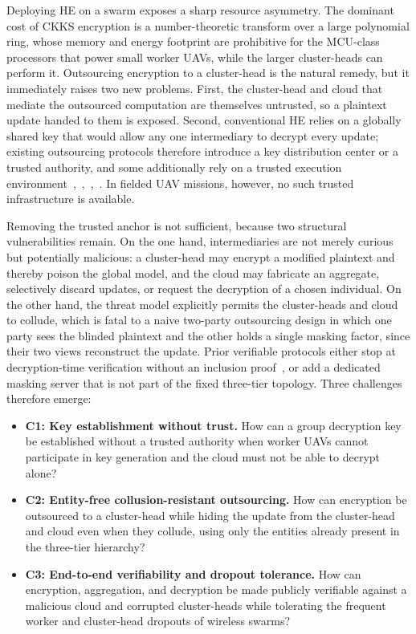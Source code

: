 Deploying HE on a swarm exposes a sharp resource asymmetry. The dominant cost of CKKS encryption is a number-theoretic transform over a large polynomial ring, whose memory and energy footprint are prohibitive for the MCU-class processors that power small worker UAVs, while the larger cluster-heads can perform it. Outsourcing encryption to a cluster-head is the natural remedy, but it immediately raises two new problems. First, the cluster-head and cloud that mediate the outsourced computation are themselves untrusted, so a plaintext update handed to them is exposed. Second, conventional HE relies on a globally shared key that would allow any one intermediary to decrypt every update; existing outsourcing protocols therefore introduce a key distribution center or a trusted authority, and some additionally rely on a trusted execution environment~\cite{li2025fedphe},~\cite{wu2025esafl},~\cite{yuan2026fedout},~\cite{cai2023secfed}. In fielded UAV missions, however, no such trusted infrastructure is available.

Removing the trusted anchor is not sufficient, because two structural vulnerabilities remain. On the one hand, intermediaries are not merely curious but potentially malicious: a cluster-head may encrypt a modified plaintext and thereby poison the global model, and the cloud may fabricate an aggregate, selectively discard updates, or request the decryption of a chosen individual. On the other hand, the threat model explicitly permits the cluster-heads and cloud to collude, which is fatal to a naive two-party outsourcing design in which one party sees the blinded plaintext and the other holds a single masking factor, since their two views reconstruct the update. Prior verifiable protocols either stop at decryption-time verification without an inclusion proof~\cite{bouamama2025vesafl}, or add a dedicated masking server that is not part of the fixed three-tier topology. Three challenges therefore emerge:

\begin{itemize}[leftmargin=*,topsep=2pt,itemsep=1pt]
  \item \textbf{C1: Key establishment without trust.} How can a group decryption key be established without a trusted authority when worker UAVs cannot participate in key generation and the cloud must not be able to decrypt alone?
  \item \textbf{C2: Entity-free collusion-resistant outsourcing.} How can encryption be outsourced to a cluster-head while hiding the update from the cluster-head and cloud even when they collude, using only the entities already present in the three-tier hierarchy?
  \item \textbf{C3: End-to-end verifiability and dropout tolerance.} How can encryption, aggregation, and decryption be made publicly verifiable against a malicious cloud and corrupted cluster-heads while tolerating the frequent worker and cluster-head dropouts of wireless swarms?
\end{itemize}

